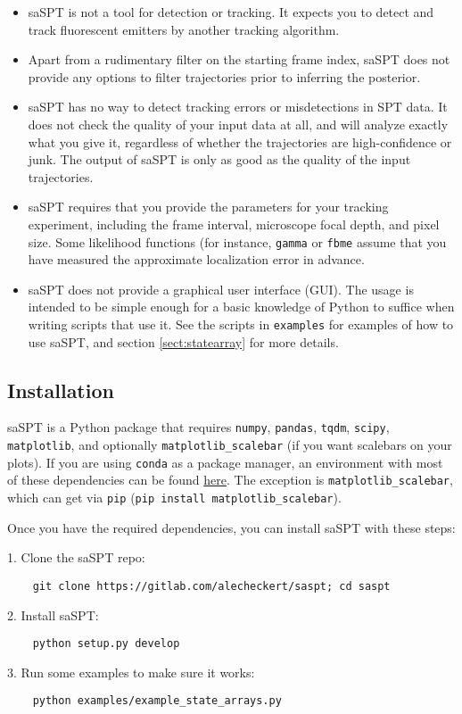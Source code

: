 \documentclass{article}
\begin{document}
\begin{itemize}
    \item saSPT is not a tool for detection or tracking. It expects you to detect and track fluorescent emitters by another tracking algorithm.
    \item Apart from a rudimentary filter on the starting frame index, saSPT does not provide any options to filter trajectories prior to inferring the posterior.
    \item saSPT has no way to detect tracking errors or misdetections in SPT data. It does not check the quality of your input data at all, and will analyze exactly what you give it, regardless of whether the trajectories are high-confidence or junk. The output of saSPT is only as good as the quality of the input trajectories.
    \item saSPT requires that you provide the parameters for your tracking experiment, including the frame interval, microscope focal depth, and pixel size. Some likelihood functions (for instance, \verb|gamma| or \verb|fbme| assume that you have measured the approximate localization error in advance.
    \item saSPT does not provide a graphical user interface (GUI). The usage is intended to be simple enough for a basic knowledge of Python to suffice when writing scripts that use it. See the scripts in \verb|examples| for examples of how to use saSPT, and section \ref{sect:statearray} for more details.
\end{itemize}

\subsection{Installation}

saSPT is a Python package that requires \verb|numpy|, \verb|pandas|, \verb|tqdm|, \verb|scipy|, \verb|matplotlib|, and optionally \verb|matplotlib_scalebar| (if you want scalebars on your plots).
If you are using \verb|conda| as a package manager, an
environment with most of these dependencies can be found
\href{https://github.com/alecheckert/quot/blob/master/quot_env.yml}{here}. The exception is 
\verb|matplotlib_scalebar|, which can get via \verb|pip| 
(\verb|pip install matplotlib_scalebar|).

Once you have the required dependencies, you can install saSPT with these steps:

1. Clone the saSPT repo:
\begin{verbatim}
    git clone https://gitlab.com/alecheckert/saspt; cd saspt
\end{verbatim}
2. Install saSPT:
\begin{verbatim}
    python setup.py develop
\end{verbatim}
3. Run some examples to make sure it works:
\begin{verbatim}
    python examples/example_state_arrays.py
\end{verbatim}
\end{document}
